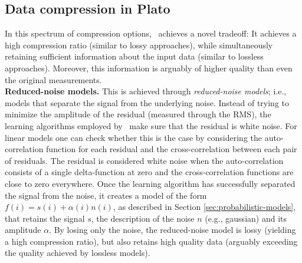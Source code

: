 
\subsection{Data compression in Plato}

In this spectrum of compression options, \projName\ achieves a novel tradeoff: It achieves a high compression ratio (similar to lossy approaches), while simultaneously retaining sufficient information about the input data (similar to lossless approaches). Moreover, this information is arguably of higher quality than even the original measurements.\\



{\bf Reduced-noise models.} This is achieved through \emph{reduced-noise models}; i.e., models that separate the signal from the underlying noise. Instead of trying to minimize the amplitude of the residual (measured through the RMS), the learning algorithms employed by \projName\ make sure that the residual is white noise. For linear models one can check whether this is the case by considering the auto-correlation function for each residual and the cross-correlation between each pair of residuals. The residual is considered white noise when the auto-correlation consists of a single delta-function at zero and the cross-correlation functions are close to zero everywhere. Once the learning algorithm has successfully separated the signal from the noise, it creates a model of the form $f(i) = s(i) + \alpha(i) n(i)$, as described in Section \ref{sec:probabilistic-models}, that retains the signal $s$, the description of the noise $n$ (e.g., gaussian) and its amplitude $\alpha$. By losing only the noise, the reduced-noise model is lossy (yielding a high compression ratio), but also retains high quality data (arguably exceeding the quality achieved by lossless models).\\

